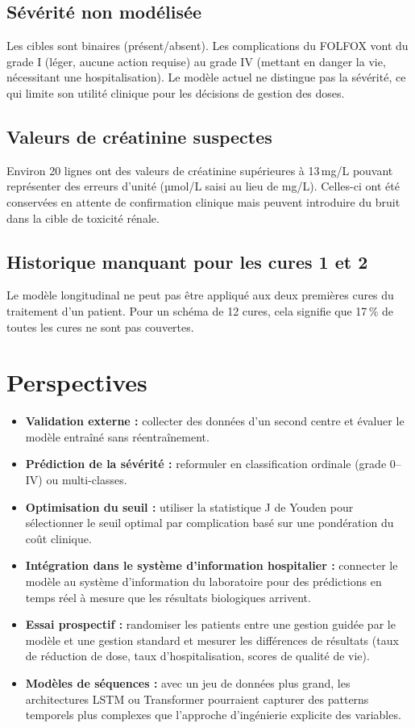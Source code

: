 \documentclass[12pt,a4paper]{report}
\begin{document}
\subsection{Sévérité non modélisée}
Les cibles sont binaires (présent/absent). Les complications du FOLFOX vont du grade I (léger, aucune action requise) au grade IV (mettant en danger la vie, nécessitant une hospitalisation). Le modèle actuel ne distingue pas la sévérité, ce qui limite son utilité clinique pour les décisions de gestion des doses.

\subsection{Valeurs de créatinine suspectes}
Environ 20 lignes ont des valeurs de créatinine supérieures à 13\,mg/L pouvant représenter des erreurs d'unité (µmol/L saisi au lieu de mg/L). Celles-ci ont été conservées en attente de confirmation clinique mais peuvent introduire du bruit dans la cible de toxicité rénale.

\subsection{Historique manquant pour les cures 1 et 2}
Le modèle longitudinal ne peut pas être appliqué aux deux premières cures du traitement d'un patient. Pour un schéma de 12 cures, cela signifie que 17\,\% de toutes les cures ne sont pas couvertes.

\section{Perspectives}

\begin{itemize}
  \item \textbf{Validation externe :} collecter des données d'un second centre et évaluer le modèle entraîné sans réentraînement.
  \item \textbf{Prédiction de la sévérité :} reformuler en classification ordinale (grade 0--IV) ou multi-classes.
  \item \textbf{Optimisation du seuil :} utiliser la statistique J de Youden pour sélectionner le seuil optimal par complication basé sur une pondération du coût clinique.
  \item \textbf{Intégration dans le système d'information hospitalier :} connecter le modèle au système d'information du laboratoire pour des prédictions en temps réel à mesure que les résultats biologiques arrivent.
  \item \textbf{Essai prospectif :} randomiser les patients entre une gestion guidée par le modèle et une gestion standard et mesurer les différences de résultats (taux de réduction de dose, taux d'hospitalisation, scores de qualité de vie).
  \item \textbf{Modèles de séquences :} avec un jeu de données plus grand, les architectures LSTM ou Transformer pourraient capturer des patterns temporels plus complexes que l'approche d'ingénierie explicite des variables.
\end{itemize}
\end{document}
